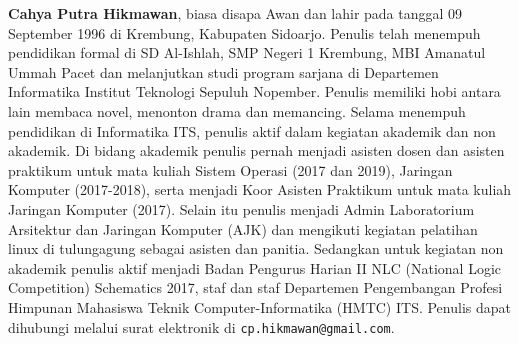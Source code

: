 \documentclass[12pt,oneside,reqno]{ta-its}
\begin{document}
	\textbf{Cahya Putra Hikmawan}, biasa disapa Awan dan lahir pada tanggal 09 September 1996 di Krembung, Kabupaten Sidoarjo. Penulis telah menempuh pendidikan formal di SD Al-Ishlah, SMP Negeri 1 Krembung, MBI Amanatul Ummah Pacet dan melanjutkan studi program sarjana di Departemen Informatika Institut Teknologi Sepuluh Nopember. Penulis memiliki hobi antara lain membaca novel, menonton drama dan memancing. Selama menempuh pendidikan di Informatika ITS, penulis aktif dalam kegiatan akademik dan non akademik. Di bidang akademik penulis pernah menjadi asisten dosen dan asisten praktikum untuk mata kuliah Sistem Operasi (2017 dan 2019), Jaringan Komputer (2017-2018), serta menjadi Koor Asisten Praktikum untuk mata kuliah Jaringan Komputer (2017). Selain itu penulis menjadi Admin Laboratorium Arsitektur dan Jaringan Komputer (AJK) dan mengikuti kegiatan pelatihan linux di tulungagung sebagai asisten dan panitia. Sedangkan untuk kegiatan non akademik penulis aktif  menjadi Badan Pengurus Harian II NLC (National Logic Competition) Schematics 2017, staf dan staf Departemen Pengembangan Profesi Himpunan Mahasiswa Teknik Computer-Informatika (HMTC) ITS. Penulis dapat dihubungi melalui surat elektronik di \texttt{cp.hikmawan@gmail.com}.
\end{document}
